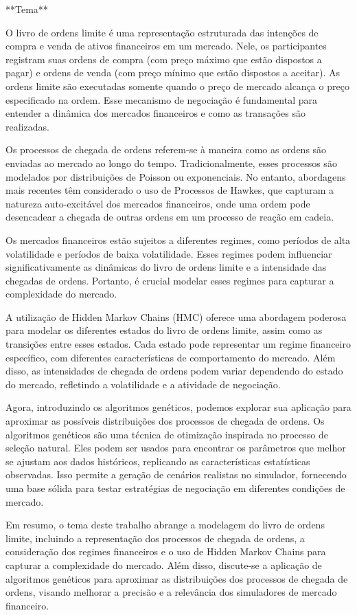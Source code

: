 **Tema**

O livro de ordens limite é uma representação estruturada das intenções de compra e venda de ativos financeiros em um mercado. Nele, os participantes registram suas ordens de compra (com preço máximo que estão dispostos a pagar) e ordens de venda (com preço mínimo que estão dispostos a aceitar). As ordens limite são executadas somente quando o preço de mercado alcança o preço especificado na ordem. Esse mecanismo de negociação é fundamental para entender a dinâmica dos mercados financeiros e como as transações são realizadas.

Os processos de chegada de ordens referem-se à maneira como as ordens são enviadas ao mercado ao longo do tempo. Tradicionalmente, esses processos são modelados por distribuições de Poisson ou exponenciais. No entanto, abordagens mais recentes têm considerado o uso de Processos de Hawkes, que capturam a natureza auto-excitável dos mercados financeiros, onde uma ordem pode desencadear a chegada de outras ordens em um processo de reação em cadeia.

Os mercados financeiros estão sujeitos a diferentes regimes, como períodos de alta volatilidade e períodos de baixa volatilidade. Esses regimes podem influenciar significativamente as dinâmicas do livro de ordens limite e a intensidade das chegadas de ordens. Portanto, é crucial modelar esses regimes para capturar a complexidade do mercado.

A utilização de Hidden Markov Chains (HMC) oferece uma abordagem poderosa para modelar os diferentes estados do livro de ordens limite, assim como as transições entre esses estados. Cada estado pode representar um regime financeiro específico, com diferentes características de comportamento do mercado. Além disso, as intensidades de chegada de ordens podem variar dependendo do estado do mercado, refletindo a volatilidade e a atividade de negociação.

Agora, introduzindo os algoritmos genéticos, podemos explorar sua aplicação para aproximar as possíveis distribuições dos processos de chegada de ordens. Os algoritmos genéticos são uma técnica de otimização inspirada no processo de seleção natural. Eles podem ser usados para encontrar os parâmetros que melhor se ajustam aos dados históricos, replicando as características estatísticas observadas. Isso permite a geração de cenários realistas no simulador, fornecendo uma base sólida para testar estratégias de negociação em diferentes condições de mercado.

Em resumo, o tema deste trabalho abrange a modelagem do livro de ordens limite, incluindo a representação dos processos de chegada de ordens, a consideração dos regimes financeiros e o uso de Hidden Markov Chains para capturar a complexidade do mercado. Além disso, discute-se a aplicação de algoritmos genéticos para aproximar as distribuições dos processos de chegada de ordens, visando melhorar a precisão e a relevância dos simuladores de mercado financeiro.